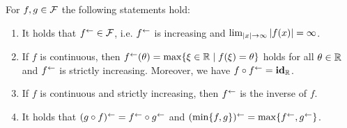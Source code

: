 \begin{proposition}\label{prop:reversal-props}
    For $f,g\in \mathcal{F}$ the following statements hold:
    \begin{enumerate}[label=(\roman*)]
        \item\label{prop:reversal-props:inner-operator} It holds that $f^{\leftarrow}\in\mathcal{F}$, i.e. $f^{\leftarrow}$ is increasing and $\lim_{\left| x \right|\rightarrow\infty} \left| f(x) \right| = \infty$.
        \item\label{prop:reversal-props:continuous} If $f$ is continuous, then $f^{\leftarrow}(\theta) = \max \{ \xi\in\mathbb{R} \mid f(\xi) = \theta \}$ holds for all $\theta\in\mathbb{R}$ and $f^{\leftarrow}$ is strictly increasing.
        Moreover, we have $f\circ f^{\leftarrow} = \mathbf{id}_{\mathbb{R}}$.
        \item\label{prop:reversal-props:inverse} If $f$ is continuous and strictly increasing, then  $f^{\leftarrow}$ is the inverse of $f$.
        \item\label{prop:reversal-props:composition-minimum} It holds that $(g\circ f)^{\leftarrow} = f^{\leftarrow}\circ g^{\leftarrow}$ and $(\min\{f,g\})^{\leftarrow} = \max\{f^{\leftarrow}, g^{\leftarrow}\}$.
    \end{enumerate}
\end{proposition}
